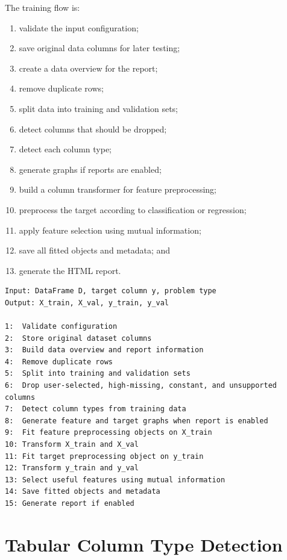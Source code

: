 \documentclass[12pt,a4paper,oneside]{report}
\begin{document}
The training flow is:

\begin{enumerate}[leftmargin=*]
  \item validate the input configuration;
  \item save original data columns for later testing;
  \item create a data overview for the report;
  \item remove duplicate rows;
  \item split data into training and validation sets;
  \item detect columns that should be dropped;
  \item detect each column type;
  \item generate graphs if reports are enabled;
  \item build a column transformer for feature preprocessing;
  \item preprocess the target according to classification or regression;
  \item apply feature selection using mutual information;
  \item save all fitted objects and metadata; and
  \item generate the HTML report.
\end{enumerate}

\begin{lstlisting}[style=algostyle,caption={General tabular preprocessing flow}]
Input: DataFrame D, target column y, problem type
Output: X_train, X_val, y_train, y_val

1:  Validate configuration
2:  Store original dataset columns
3:  Build data overview and report information
4:  Remove duplicate rows
5:  Split into training and validation sets
6:  Drop user-selected, high-missing, constant, and unsupported columns
7:  Detect column types from training data
8:  Generate feature and target graphs when report is enabled
9:  Fit feature preprocessing objects on X_train
10: Transform X_train and X_val
11: Fit target preprocessing object on y_train
12: Transform y_train and y_val
13: Select useful features using mutual information
14: Save fitted objects and metadata
15: Generate report if enabled
\end{lstlisting}

\section{Tabular Column Type Detection}
\end{document}
